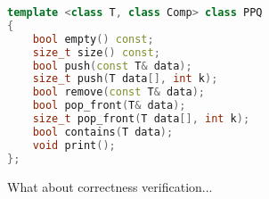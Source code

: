 \begin{lstlisting}[language=C++,caption=PPQ interface]
template <class T, class Comp> class PPQ
{
	bool empty() const;
	size_t size() const;
	bool push(const T& data);
	size_t push(T data[], int k);
	bool remove(const T& data);
	bool pop_front(T& data);
	size_t pop_front(T data[], int k);
	bool contains(T data);
	void print();
};
\end{lstlisting}

What about correctness verification...